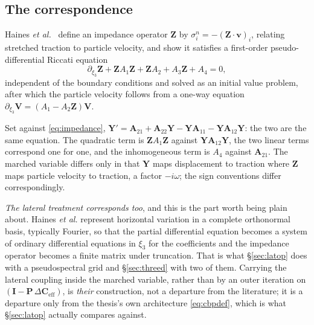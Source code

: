 \documentclass[11pt,a4paper]{article}
\newcommand{\bI}{\mathbf{I}}
\newcommand{\bA}{\mathbf{A}}
\newcommand{\bP}{\mathbf{P}}
\newcommand{\dCeff}{\Delta\mathbf{C}_{\mathrm{eff}}}
\newcommand{\bY}{\mathbf{Y}}
\begin{document}
\subsection{The correspondence}

Haines \emph{et al.}\ \cite{haines2004} define an impedance operator $\mathbf{Z}$ by
$\sigma^{n}_{i} = -(\mathbf{Z}\cdot\mathbf{v})_{i}$, relating stretched traction
to particle velocity, and show it satisfies a first-order pseudo-differential
Riccati equation
\begin{equation}
  \partial_{\xi_3}\mathbf{Z} + \mathbf{Z}A_1\mathbf{Z} + \mathbf{Z}A_2
    + A_3\mathbf{Z} + A_4 = 0 ,
  \label{eq:hainesriccati}
\end{equation}
independent of the boundary conditions and solved as an initial value problem,
after which the particle velocity follows from a one-way equation
$\partial_{\xi_3}\mathbf{V} = (A_1 - A_2\mathbf{Z})\mathbf{V}$.

Set against \eqref{eq:impedance}, $\bY' = \bA_{21} + \bA_{22}\bY - \bY\bA_{11}
- \bY\bA_{12}\bY$: the two are the same equation.  The quadratic term is
$\mathbf{Z}A_1\mathbf{Z}$ against $\bY\bA_{12}\bY$, the two linear terms
correspond one for one, and the inhomogeneous term is $A_4$ against $\bA_{21}$.
The marched variable differs only in that $\bY$ maps displacement to traction
where $\mathbf{Z}$ maps particle velocity to traction, a factor $-i\omega$; the
sign conventions differ correspondingly.

\emph{The lateral treatment corresponds too}, and this is the part worth being
plain about.  Haines \emph{et al.} represent horizontal variation in a complete
orthonormal basis, typically Fourier, so that the partial differential equation
becomes a system of ordinary differential equations in $\xi_3$ for the
coefficients and the impedance operator becomes a finite matrix under
truncation.  That is what \S\ref{sec:latop} does with a pseudospectral grid and
\S\ref{sec:threed} with two of them.  Carrying the lateral coupling inside the
marched variable, rather than by an outer iteration on
$(\bI-\bP\,\dCeff)$, is \emph{their} construction, not a departure from the
literature; it is a departure only from the thesis's own architecture
\eqref{eq:cbpdef}, which is what \S\ref{sec:latop} actually compares against.
\end{document}

